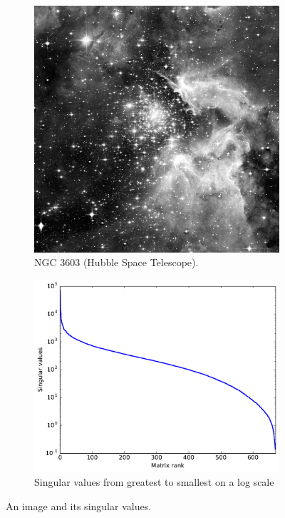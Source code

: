 \begin{figure}
\centering
\begin{subfigure}[b]{.49\textwidth}
\centering
\includegraphics[width=\textwidth*5/6]{hubble_red}
\caption{NGC 3603 (Hubble Space Telescope).}
\label{fig:hubble_original}
\end{subfigure}
\begin{subfigure}[b]{.49\textwidth}
\centering
\includegraphics[width=\textwidth]{hubble_svals}
\caption{Singular values from greatest to smallest on a log scale}
\label{fig:svals_plot}
\end{subfigure}
\caption{An image and its singular values.}
\label{fig:hubble}
\end{figure}

